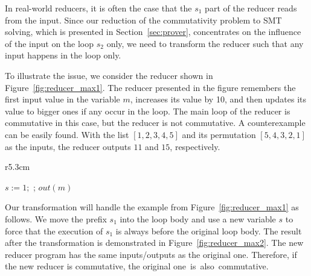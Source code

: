 \documentclass{llncs}
\newcommand{\cur}{cur()}
\begin{document}
In real-world reducers, it is often the case that the $s_1$ part of the reducer
reads from the input. Since our reduction of the commutativity problem to SMT
solving, which is presented in Section~\ref{sec:prover}, concentrates on the
influence of the input on the loop $s_2$ only, we need to transform the reducer
such that any input happens in the loop only. 

To illustrate the issue, we consider the reducer shown in
Figure~\ref{fig:reducer_max1}.
%
The reducer presented in the figure remembers the first input value in the
variable $m$, increases its value by 10, and then updates its value to bigger
ones if any occur in the loop.  The main loop of the reducer is commutative in
this case, but the reducer is not commutative. A counterexample can be easily
found. With the list $[1,2,3,4,5]$ and its permutation $[5,4,3,2,1]$ as the
inputs, the reducer outputs $11$ and $15$, respectively.

\begin{wrapfigure}[12]{r}{5.3cm}
	\vspace{-10mm}
	\begin{algorithm}[H]
		$s:=1;$\;
		\Loop{}{
			\uIf{$s=1$}{$m := \cur + 10; s:= 2$}
			\uElse{
				$t:=\cur$\;
				\uIf{ $t > m$}{
					$m := t$ \;
				}
			}
		};
		$out(m)$
	\end{algorithm}	
	\vspace{-2mm}
	\caption{The max$^{+\mathtt{fix}}$ reducer.}
	\vspace{-4mm}
	\label{fig:reducer_max2}
\end{wrapfigure}

Our transformation will handle the example from Figure~\ref{fig:reducer_max1} as
follows.
%
We move the prefix $s_1$ into the loop body and use a new variable $s$ to force
that the execution of $s_1$ is always before the original loop body. The result
after the transformation is demonstrated in Figure~\ref{fig:reducer_max2}. The
new reducer program has the same inputs/outputs as the original one. Therefore,
if the new reducer is commutative, the original one~is~also~commutative.

%
\end{document}
